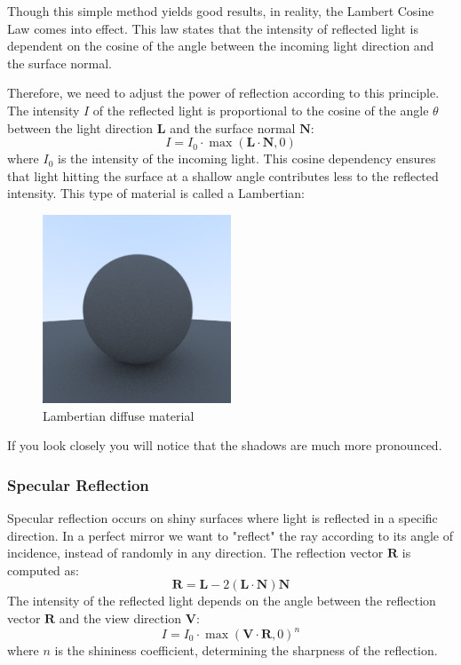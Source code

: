 \documentclass[12pt]{article}
\begin{document}
Though this simple method yields good results, in reality, the Lambert Cosine Law comes into effect. This law states that the intensity of reflected light is dependent on the cosine of the angle between the incoming light direction and the surface normal.

Therefore, we need to adjust the power of reflection according to this principle.
The intensity \(I\) of the reflected light is proportional to the cosine of the angle \(\theta\) between the light direction \(\mathbf{L}\) and the surface normal \(\mathbf{N}\):
\[
    I = I_0 \cdot \max(\mathbf{L} \cdot \mathbf{N}, 0)
\]
where \(I_0\) is the intensity of the incoming light. This cosine dependency ensures that light hitting the surface at a shallow angle contributes less to the reflected intensity.
This type of material is called a Lambertian:

\begin{figure}[H]
    \centering
    \includegraphics[width=0.5\textwidth]{images/lambertian/lambertian_diffuse.png}
    \caption{Lambertian diffuse material}
    \label{fig:lambdiffmat}
\end{figure}

If you look closely you will notice that the shadows are much more pronounced.

\subsubsection{Specular Reflection}
Specular reflection occurs on shiny surfaces where light is reflected in a specific direction. In a perfect mirror we want to "reflect" the ray according to its angle of incidence, instead of randomly in any direction.
The reflection vector \(\mathbf{R}\) is computed as:
\[
    \mathbf{R} = \mathbf{L} - 2(\mathbf{L} \cdot \mathbf{N})\mathbf{N}
\]
The intensity of the reflected light depends on the angle between the reflection vector \(\mathbf{R}\) and the view direction \(\mathbf{V}\):
\[
    I = I_0 \cdot \max(\mathbf{V} \cdot \mathbf{R}, 0)^n
\]
where \(n\) is the shininess coefficient, determining the sharpness of the reflection.
\end{document}
